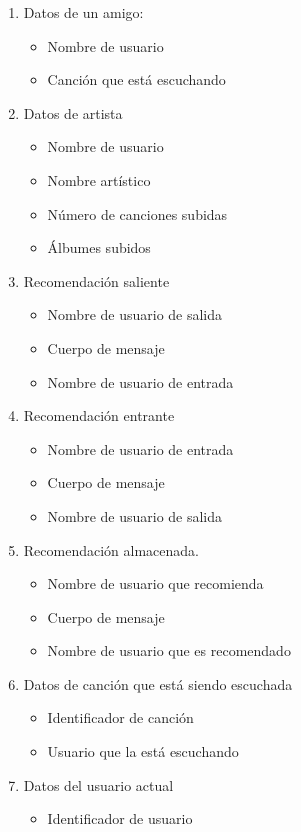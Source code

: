 \documentclass[12pt,a4paper]{article}
\begin{document}
\begin{enumerate}[label=\textnormal{RD\arabic*}]
	\item Datos de un amigo:  \label{rd25}
		\begin{itemize}
			\item Nombre de usuario
			\item Canción que está escuchando
		\end{itemize}
	\item Datos de artista  \label{rd26}
		\begin{itemize}
			\item Nombre de usuario
			\item Nombre artístico
			\item Número de canciones subidas
			\item Álbumes subidos
		\end{itemize}
	\item Recomendación saliente  \label{rd27}
		\begin{itemize}
			\item Nombre de usuario de salida
			\item Cuerpo de mensaje
			\item Nombre de usuario de entrada
		\end{itemize}
	\item Recomendación entrante  \label{rd28}
		\begin{itemize}
			\item Nombre de usuario de entrada
			\item Cuerpo de mensaje
			\item Nombre de usuario de salida
		\end{itemize}
	\item Recomendación almacenada.  \label{rd29}
		\begin{itemize}
			\item Nombre de usuario que recomienda
			\item Cuerpo de mensaje
			\item Nombre de usuario que es recomendado
		\end{itemize}
	\item Datos de canción que está siendo escuchada  \label{rd30}
		\begin{itemize}
			\item Identificador de canción
			\item Usuario que la está escuchando
		\end{itemize}
	\item Datos del usuario actual  \label{rd31}
		\begin{itemize}
			\item Identificador de usuario

\end{itemize}
\end{enumerate}
\end{document}
